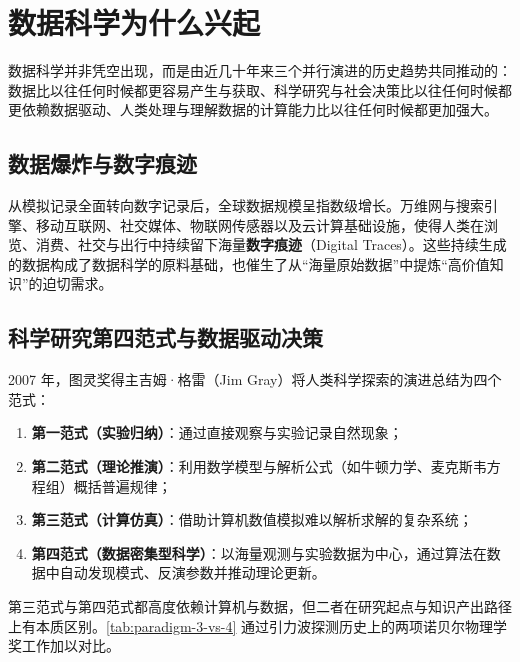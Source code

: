 \section{数据科学为什么兴起}\label{sec:why-ds}

数据科学并非凭空出现，而是由近几十年来三个并行演进的历史趋势共同推动的：数据比以往任何时候都更容易产生与获取、科学研究与社会决策比以往任何时候都更依赖数据驱动、人类处理与理解数据的计算能力比以往任何时候都更加强大。

\subsection{数据爆炸与数字痕迹}

从模拟记录全面转向数字记录后，全球数据规模呈指数级增长。万维网与搜索引擎、移动互联网、社交媒体、物联网传感器以及云计算基础设施，使得人类在浏览、消费、社交与出行中持续留下海量\textbf{数字痕迹}（Digital Traces）。这些持续生成的数据构成了数据科学的原料基础，也催生了从“海量原始数据”中提炼“高价值知识”的迫切需求。

\subsection{科学研究第四范式与数据驱动决策}

2007 年，图灵奖得主吉姆·格雷（Jim Gray）将人类科学探索的演进总结为四个范式：
\begin{enumerate}
  \item \textbf{第一范式（实验归纳）}：通过直接观察与实验记录自然现象；
  \item \textbf{第二范式（理论推演）}：利用数学模型与解析公式（如牛顿力学、麦克斯韦方程组）概括普遍规律；
  \item \textbf{第三范式（计算仿真）}：借助计算机数值模拟难以解析求解的复杂系统；
  \item \textbf{第四范式（数据密集型科学）}：以海量观测与实验数据为中心，通过算法在数据中自动发现模式、反演参数并推动理论更新。
\end{enumerate}

第三范式与第四范式都高度依赖计算机与数据，但二者在研究起点与知识产出路径上有本质区别。\cref{tab:paradigm-3-vs-4} 通过引力波探测历史上的两项诺贝尔物理学奖工作加以对比。

